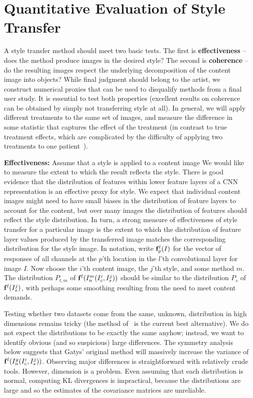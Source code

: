 \documentclass[runningheads]{llncs}
\newcommand{\vect}[1]{{\bf {#1}}}
\begin{document}
\section{Quantitative Evaluation of Style Transfer}\label{effcoh}

A style transfer method should meet two basic tests.  The first is {\bf effectiveness} -- does the
method produce images in the desired style? The second is {\bf coherence} -- do the resulting images respect the
underlying decomposition of the content image into objects?   While final judgment should belong to the artist, we
construct numerical proxies that can be used to disqualify methods from a final user study. It is essential to test both
properties (excellent results on coherence can be obtained by simply not transferring style at all).
In general, we will apply different treatments to the same set of images, and measure the difference in some statistic that captures the
effect of the treatment (in contrast to true treatment effects, which are complicated by the difficulty of applying two treatments to one patient~\cite{SIM:SIM893}).   

{\bf Effectiveness:}  Assume that a style is applied to a content image  We would like to measure the extent to which the result reflects the style.  There is good evidence that the distribution of features within lower feature layers of a CNN representation is an effective proxy for style.  We expect that individual content images might need to have small biases in the distribution of feature layers to account for the content, but over many images the distribution of features should reflect the style distribution.  In turn, a strong measure of effectiveness of style transfer for a particular image is the extent to which the distribution of feature layer values produced by the transferred image matches the corresponding distribution for the style image. In notation, write $\vect{f}^{l}_{p}(I)$ for the vector of responses  of all channels  at the  $p$'th location in the $l$'th convolutional layer for image $I$. Now choose the $i$'th content image, the $j$'th style, and some method $m$.  The distribution $P_{t, m}$ of $\vect{f}^{l}(I^m_n(I_c^i,I_s^j))$ should be similar to  the distribution $P_s$ of $\vect{f}^{l}(I_s^j)$, with perhaps some smoothing  resulting from the need to meet content demands.   

Testing whether two datasets come from the same, unknown, distribution in high dimensions remains tricky (the method of~\cite{gretton2012kernel} is the current best alternative).  We do not expect the distributions to be exactly the same anyhow;  instead, we want to identify obvious (and so suspicious) large  differences. The symmetry analysis below suggests that Gatys' original method will massively increase the variance of  $\vect{f}^{l}(I^g_n(I_c^i,I_s^j))$.  Observing major differences is straightforward with relatively crude tools.   However, dimension is a problem.  Even assuming that each distribution is normal,  computing KL divergences is impractical, because the distributions are large and so the estimates of the covariance matrices are unreliable.   
\end{document}
